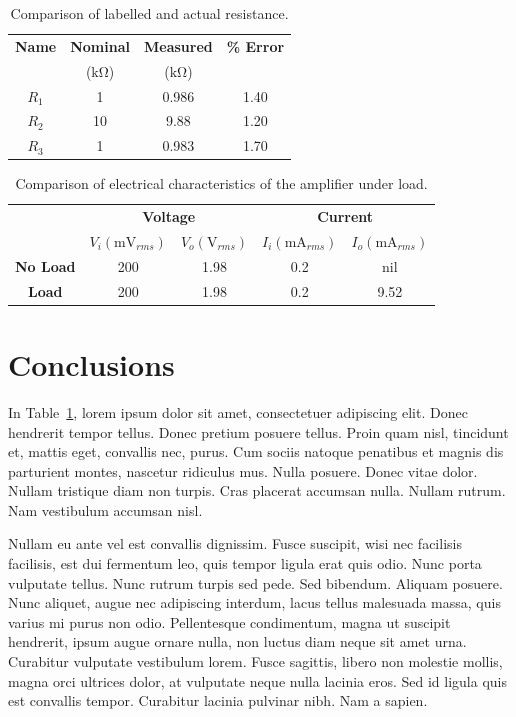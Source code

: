 \documentclass{article}
\begin{document}
\begin{table}[h]
  \label{tab:table_01}
  \centering
  \begin{tabular}{*{4}{c}}
    \textbf{Name} & \textbf{Nominal} & \textbf{Measured} & \textbf{\% Error} \\
    & ($\si{\kilo\ohm}$) & ($\si{\kilo\ohm}$) & \\
    \hline
    $R_1$ & 1 & 0.986 & 1.40 \\
    $R_2$ & 10 & 9.88 & 1.20 \\
    $R_3$ & 1 & 0.983 & 1.70 \\
  \end{tabular}
  \caption{Comparison of labelled and actual resistance.}
\end{table}

\begin{table}[h]
  \label{tab:table_02}
  \centering
  \begin{tabular}{*{5}{c}}
    & \multicolumn{2}{c}{\textbf{Voltage}} & \multicolumn{2}{c}{\textbf{Current}} \\
    & $V_i (\si{\milli\volt_{rms}})$ & $V_o (\si{\volt_{rms}})$ & $I_i (\si{\milli\ampere_{rms}})$ & $I_o (\si{\milli\ampere_{rms}})$ \\
    \hline
    \textbf{No Load} & 200 & 1.98 & 0.2 & nil \\
    \textbf{Load} & 200 & 1.98 & 0.2 & 9.52 \\
  \end{tabular}
  \caption{Comparison of electrical characteristics of the amplifier under load.}
\end{table}

\section{Conclusions}
\label{sec:conclusion}

In Table~\ref{tab:table_01}, lorem ipsum dolor sit amet, consectetuer
adipiscing elit. Donec hendrerit tempor tellus. Donec pretium posuere
tellus. Proin quam nisl, tincidunt et, mattis eget, convallis nec,
purus. Cum sociis natoque penatibus et magnis dis parturient montes,
nascetur ridiculus mus. Nulla posuere. Donec vitae dolor. Nullam
tristique diam non turpis. Cras placerat accumsan nulla. Nullam
rutrum. Nam vestibulum accumsan nisl.

Nullam eu ante vel est convallis dignissim. Fusce suscipit, wisi nec
facilisis facilisis, est dui fermentum leo, quis tempor ligula erat
quis odio. Nunc porta vulputate tellus. Nunc rutrum turpis sed
pede. Sed bibendum. Aliquam posuere. Nunc aliquet, augue nec
adipiscing interdum, lacus tellus malesuada massa, quis varius mi
purus non odio. Pellentesque condimentum, magna ut suscipit hendrerit,
ipsum augue ornare nulla, non luctus diam neque sit amet
urna. Curabitur vulputate vestibulum lorem. Fusce sagittis, libero non
molestie mollis, magna orci ultrices dolor, at vulputate neque nulla
lacinia eros. Sed id ligula quis est convallis tempor. Curabitur
lacinia pulvinar nibh. Nam a sapien.
\end{document}
